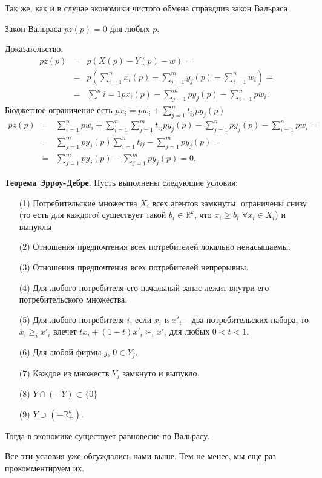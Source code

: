 Так же, как и в случае экономики чистого обмена справдлив закон Вальраса

\underline{Закон Вальраса} $pz(p)=0$ для любых $p$.

Доказательство.
\begin{eqnarray*}
pz(p)&=&p(X(p)-Y(p)-w)=\\
&=&p\left (\sum^n_{i=1}x_i(p)-\sum^m_{j=1}y_j(p)-\sum^n_{i=1}w_i\right )=\\
&=&\sum^n{i=1}px_i(p)-\sum^m_{j=1}py_j(p)-\sum^n_{i=1}pw_i.
\end{eqnarray*}
Бюджетное ограничение есть $px_i=pw_i+\sum^n_{j=1}t_{ij}py_j(p)$
\begin{eqnarray*}
pz(p)&=&\sum^n_{i=1}pw_i+\sum^n_{i=1}\sum^m_{j=1}t_{ij}py_j(p)-\sum^n_{j=1}py_j(p)-\sum^n_{i=1}pw_i=\\
&=&\sum^m_{j=1}py_j(p)\sum^n_{i=1}t_{ij}-\sum^m_{j=1}py_j(p)=\\
&=&\sum^m_{j=1}py_j(p)-\sum^m_{j=1}py_j(p)=0.
\end{eqnarray*}

\textbf{Теорема Эрроу-Дебре}.  Пусть выполнены следующие условия:
\begin{itemize}
\item[(1)] Потребительские множества $X_i$ всех агентов замкнуты, ограничены снизу
(то есть для каждого$i$ существует такой $b_i\in\mathbb{R}^k$, что
$x_i\geq b_i\,\,\forall x_i \in X_i$) и выпуклы.
\item[(2)] Отношения предпочтения всех потребителей локально ненасыщаемы.
\item[(3)] Отношения предпочтения всех потребителей непрерывны.
\item[(4)] Для любого потребителя его начальный запас лежит внутри его потребительского
множества.
\item[(5)] Для любого потребителя $i$, если $x_i$ и $x'_i$ -- два
потребительских набора, то $x_i \ge _ix'_i$ влечет
$tx_i+(1-t)x'_i\succ_ix'_i$ для любых $0<t<1$.
\item[(6)] Для любой фирмы $j$, $0\in Y_j.$
\item[(7)] Каждое из множеств $Y_j$ замкнуто и выпукло.
\item[(8)] $Y\cap (-Y)\subset\{0\}$
\item[(9)]  $Y\supset (-\mathbb{R}^k_+).$
\end{itemize}
Тогда в экономике существует равновесие по Вальрасу.

Все эти условия уже обсуждались нами выше. Тем не менее, мы еще
раз прокомментируем их.


